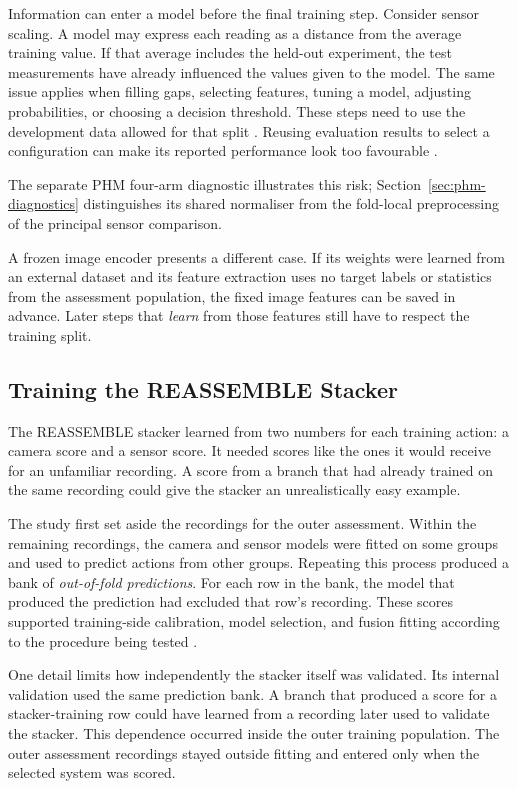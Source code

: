 Information can enter a model before the final training step. Consider sensor scaling. A
model may express each reading as a distance from the average training value. If that
average includes the held-out experiment, the test measurements have already influenced
the values given to the model. The same issue applies when filling gaps, selecting
features, tuning a model, adjusting probabilities, or choosing a decision threshold.
These steps need to use the development data allowed for that split \parencite{P017}.
Reusing evaluation results to select a configuration can make its reported performance
look too favourable \parencite{P004}.

The separate PHM four-arm diagnostic illustrates this risk;
Section~\ref{sec:phm-diagnostics} distinguishes its shared normaliser from the
fold-local preprocessing of the principal sensor comparison.

A frozen image encoder presents a different case. If its weights were learned from an
external dataset and its feature extraction uses no target labels or statistics from the
assessment population, the fixed image features can be saved in advance. Later steps
that \emph{learn} from those features still have to respect the training split.

\subsection{Training the REASSEMBLE Stacker}

The REASSEMBLE stacker learned from two numbers for each training action: a camera score
and a sensor score. It needed scores like the ones it would receive for an unfamiliar
recording. A score from a branch that had already trained on the same recording could
give the stacker an unrealistically easy example.

The study first set aside the recordings for the outer assessment. Within the remaining
recordings, the camera and sensor models were fitted on some groups and used to predict
actions from other groups. Repeating this process produced a bank of \emph{out-of-fold
predictions}. For each row in the bank, the model that produced the prediction had
excluded that row's recording. These scores supported training-side calibration, model
selection, and fusion fitting according to the procedure being tested
\parencite{Ting1999Issues}.

One detail limits how independently the stacker itself was validated. Its internal
validation used the same prediction bank. A branch that produced a score for a
stacker-training row could have learned from a recording later used to validate the
stacker. This dependence occurred inside the outer training population. The
outer assessment recordings stayed outside fitting and entered only when the selected
system was scored.

